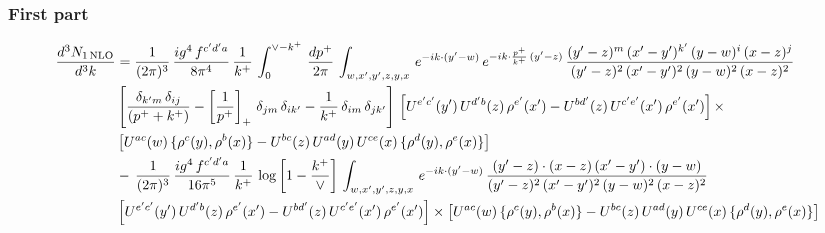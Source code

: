 \documentclass[9pt]{article}
\numberwithin{equation}{section}
\begin{document}
 \subsubsection{First part}
 \begin{align}
     \frac{d^{3}N_{1\,\rm NLO}}{d^{3}k} & = \frac{1}{(2\pi)^{3}}\, \frac{ig^{4}\,f^{c'd'a}}{8\pi^{4}}\, \frac{1}{k^{+}}\,\int_{0}^{\vee-k^{+}}\,  \frac{dp^{+}}{2\pi}\, \int_{w,x',y',z,y,x}\, e^{-ik\cdot (y'-w)}\, e^{-ik\cdot \frac{p^{+}}{k^{+}}\,(y'-z)}\,\frac{(y'-z)^{m}\,(x'-y')^{k'}\,(y-w)^{i}\,(x-z)^{j}}{(y'-z)^{2}\,(x'-y')^{2}\,(y-w)^{2}\,(x-z)^{2}}\notag \\ & \left[\frac{\delta_{k'm}\,\delta_{ij}}{(p^{+}+k^{+})}-\left[\frac{1}{p^{+}}\right]_{+}\,\delta_{jm}\,\delta_{ik'}-\frac{1}{k^{+}}\, \delta_{im}\, \delta_{jk'}\right]\, \left[U^{e'c'}(y')\,U^{d'b}(z)\,\rho^{e'}(x')-U^{bd'}(z)\,U^{c'e'}(x')\,\rho^{e'}(x')\right]\times\notag \\ &  \left[U^{ac}(w)\, \{\rho^{c}(y),\rho^{b}(x)\}-U^{bc}(z)\,U^{ad}(y)\,U^{ce}(x)\,\{\rho^{d}(y),\rho^{e}(x)\}\right]\notag \\ & -\,\frac{1}{(2\pi)^{3}}\, \frac{ig^{4}\,f^{c'd'a}}{16\pi^{5}}\, \frac{1}{k^{+}}\, \log{\left[1-\frac{k^{+}}{\vee}\right]}\, \int_{w,x',y',z,y,x}\, e^{-ik\cdot (y'-w)}\,\frac{(y'-z)\cdot (x-z)\,(x'-y')\cdot (y-w)}{(y'-z)^{2}\,(x'-y')^{2}\,(y-w)^{2}\,(x-z)^{2}}\notag \\ &  \left[U^{e'c'}(y')\,U^{d'b}(z)\,\rho^{e'}(x')-U^{bd'}(z)\,U^{c'e'}(x')\,\rho^{e'}(x')\right]\times  \left[U^{ac}(w)\, \{\rho^{c}(y),\rho^{b}(x)\}-U^{bc}(z)\,U^{ad}(y)\,U^{ce}(x)\,\{\rho^{d}(y),\rho^{e}(x)\}\right]
\end{align}
\end{document}
